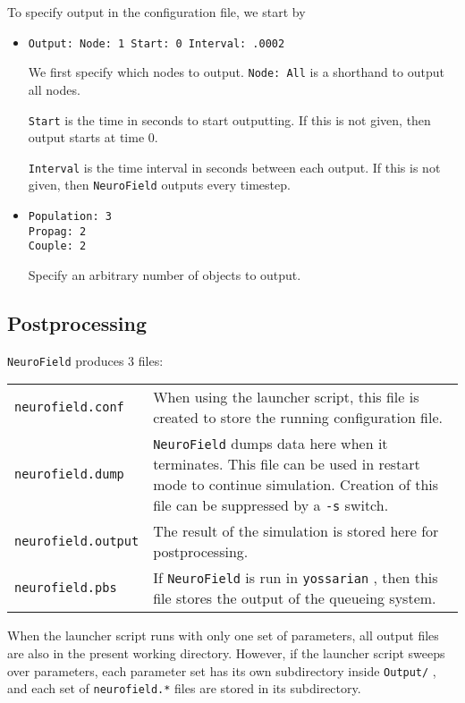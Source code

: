 \documentclass[12pt,a4paper]{article}
\newcommand{\type}[1]{ {\small\small\tt #1} }
\begin{document}
To specify output in the configuration file, we start by 
\begin{itemize}
	\item
	\begin{lstlisting}
Output: Node: 1 Start: 0 Interval: .0002
	\end{lstlisting}
	We first specify which nodes to output. \type{Node: All} is a shorthand to output all nodes.

	\type{Start} is the time in seconds to start outputting. If this is not given, then output starts at time 0.

	\type{Interval} is the time interval in seconds between each output. If this is not given, then \type{NeuroField} outputs every timestep.

\item
	\begin{lstlisting}
Population: 3
Propag: 2
Couple: 2
	\end{lstlisting}
	Specify an arbitrary number of objects to output.

\end{itemize}

\subsection{Postprocessing}

\type{NeuroField} produces 3 files:

\begin{tabular}{l p{11.5cm}}
\type{neurofield.conf}& When using the launcher script, this file is created to store the running configuration file.\\
\type{neurofield.dump}& \type{NeuroField} dumps data here when it terminates. This file can be used in restart mode to continue simulation. Creation of this file can be suppressed by a \type{-s} switch.\\
\type{neurofield.output}& The result of the simulation is stored here for postprocessing.\\
\type{neurofield.pbs}& If \type{NeuroField} is run in \type{yossarian}, then this file stores the output of the queueing system.
\end{tabular}

When the launcher script runs with only one set of parameters, all output files are also in the present working directory. However, if the launcher script sweeps over parameters, each parameter set has its own subdirectory inside \type{Output/}, and each set of \type{neurofield.*} files are stored in its subdirectory.
\end{document}
